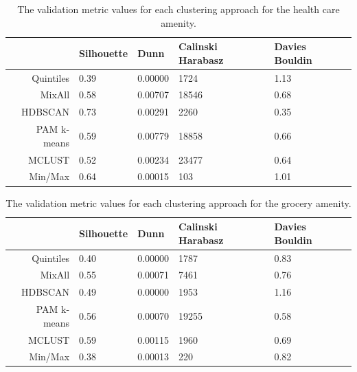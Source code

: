 \documentclass[11pt, a4paper]{article}
\begin{document}
\centering
\begin{longtable}[h]{|r|llll|}
\caption[Health care validation metrics]{The validation metric values for each clustering approach for the health care amenity.}\label{healthcarevalid}
\endfirsthead
\endhead
  \hline
 & Silhouette & Dunn & Calinski Harabasz & Davies Bouldin \\
  \hline
Quintiles & 0.39 & 0.00000 &  1724 & 1.13 \\
   \hline
MixAll & 0.58 & 0.00707 & 18546 & 0.68 \\
   \hline
HDBSCAN & \cellcolor{gray!25} 0.73 & \cellcolor{gray!25} 0.00291 &  2260 & \cellcolor{gray!25} 0.35 \\
   \hline
PAM k-means & 0.59 & 0.00779 & 18858 & 0.66 \\
   \hline
MCLUST & 0.52 & 0.00234 & \cellcolor{gray!25} 23477 & 0.64 \\
   \hline
Min/Max & 0.64 & 0.00015 &   103 & 1.01 \\
   \hline
\end{longtable}









\centering
\begin{longtable}[h]{|r|llll|}
\caption[Grocery validation metrics]{The validation metric values for each clustering approach for the grocery amenity.}\label{groceryvalid}
\endfirsthead
\endhead
  \hline
 & Silhouette & Dunn & Calinski Harabasz & Davies Bouldin \\
  \hline
Quintiles & 0.40 & 0.00000 &  1787 & 0.83 \\
   \hline
MixAll & 0.55 & 0.00071 &  7461 & 0.76 \\
   \hline
HDBSCAN & 0.49 & 0.00000 &  1953 & 1.16 \\
   \hline
PAM k-means & 0.56 & 0.00070 & \cellcolor{gray!25} 19255 & \cellcolor{gray!25} 0.58 \\
   \hline
MCLUST & \cellcolor{gray!25} 0.59 & \cellcolor{gray!25} 0.00115 &  1960 & 0.69 \\
   \hline
Min/Max & 0.38 & 0.00013 &   220 & 0.82 \\
   \hline
\end{longtable}
\end{document}
